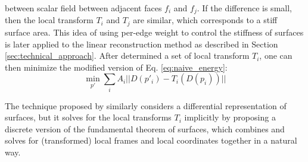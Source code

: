 \documentclass{6838publ}
\begin{document}
between scalar field between adjacent faces $f_{i}$ and $f_{j}$.  If
the difference is small, then the local transform $T_{i}$ and $T_{j}$
are similar, which corresponds to a stiff surface area.  This idea of
using per-edge weight to control the stiffness of surfaces is later
applied to the linear reconstruction method as described in Section
\ref{sec:technical_approach}. After determined a set of local
transform $T_{i}$, one can then minimize the modified version of
Eq. \ref{eq:naive_energy}:
\begin{equation} \min_{p'} \sum_{i} A_{i} || D(p'_{i}) -
T_{i}(D(p_{i}))||
\end{equation}
\par The technique proposed by \cite{wang2012linear} similarly
considers a differential representation of surfaces, but it solves for
the local transforms $T_{i}$ implicitly by proposing a discrete
version of the fundamental theorem of surfaces, which combines and
solves for (transformed) local frames and local coordinates together
in a natural way.
\end{document}
